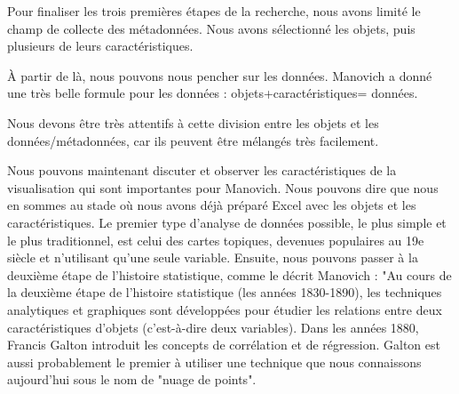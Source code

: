 \documentclass[a4paper, twoside, 12pt]{book}
\begin{document}
Pour finaliser les trois premières étapes de la recherche, nous avons limité le champ de collecte des métadonnées. Nous avons sélectionné les objets, puis plusieurs de leurs caractéristiques.

À partir de là, nous pouvons nous pencher sur les données. Manovich a donné une très belle formule pour les données : objets+caractéristiques= données.

Nous devons être très attentifs à cette division entre les objets et les données/métadonnées, car ils peuvent être mélangés très facilement. 

Nous pouvons maintenant discuter et observer les caractéristiques de la visualisation qui sont importantes pour Manovich. Nous pouvons dire que nous en sommes au stade où nous avons déjà préparé Excel avec les objets et les caractéristiques.  Le premier type d'analyse de données possible, le plus simple et le plus traditionnel, est celui des cartes topiques, devenues populaires au 19e siècle et n'utilisant qu'une seule variable. Ensuite, nous pouvons passer à la deuxième étape de l'histoire statistique, comme le décrit Manovich : "Au cours de la deuxième étape de l'histoire statistique (les années 1830-1890), les techniques analytiques et graphiques sont développées pour étudier les relations entre deux caractéristiques d'objets (c'est-à-dire deux variables). Dans les années 1880, Francis Galton introduit les concepts de corrélation et de régression. Galton est aussi probablement le premier à utiliser une technique que nous connaissons aujourd'hui sous le nom de "nuage de points".
\end{document}
